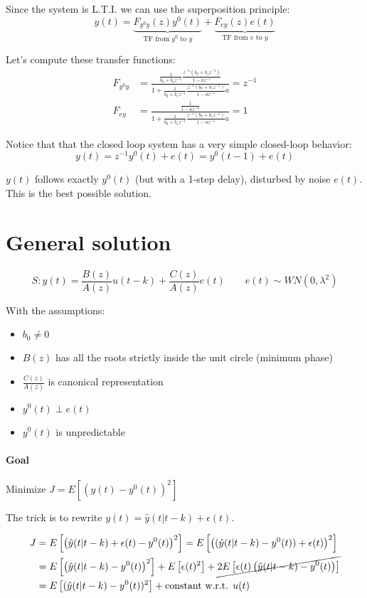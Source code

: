 Since the system is L.T.I. we can use the superposition principle:
\[
    y(t) = \underbrace{F_{y^0y}(z)y^0(t)}_\text{TF from $y^0$ to $y$} + \underbrace{F_{ey}(z)e(t)}_\text{TF from $e$ to $y$}
\]

Let's compute these transfer functions:
\begin{align*}
    F_{y^0y} &= \frac{ \frac{1}{b_0+b_1z^{-1}} \frac{z^{-1}(b_0+b_1z^{-1})}{1-az^{-1}} }{ 1 + \frac{1}{b_0+b_1z^{-1}} \frac{z^{-1}(b_0+b_1z^{-1})}{1-az^{-1}}a } = z^{-1} \\
    F_{ey} &= \frac{ \frac{1}{1-az^{-1}} }{ 1 + \frac{1}{b_0+b_1z^{-1}} \frac{z^{-1}(b_0+b_1z^{-1})}{1-az^{-1}}a } = 1
\end{align*}

Notice that that the closed loop system has a very simple closed-loop behavior:
\[
    y(t) = z^{-1}y^0(t) + e(t) = y^0(t-1) + e(t)
\]

$y(t)$ follows exactly $y^0(t)$ (but with a 1-step delay), disturbed by noise $e(t)$.
This is the best possible solution.

\section{General solution}

\[
    S: y(t) = \frac{B(z)}{A(z)}u(t-k) + \frac{C(z)}{A(z)}e(t) \qquad e(t) \sim WN(0, \lambda^2)
\]

With the assumptions:
\begin{itemize}
    \item $b_0 \ne 0$
    \item $B(z)$ has all the roots strictly inside the unit circle (minimum phase)
    \item $\frac{C(z)}{A(z)}$ is canonical representation
    \item $y^0(t) \perp e(t)$
    \item $y^0(t)$ is unpredictable
\end{itemize}

\paragraph{Goal} Minimize $J = E\left[ \left( y(t) - y^0(t) \right)^2 \right]$

The trick is to rewrite $y(t) = \hat{y}(t|t-k) + \epsilon(t)$.

\begin{align*}
    J &= E\left[ \left( \hat{y}(t|t-k) + \epsilon(t) - y^0(t) \right)^2 \right] = E\left[ \left( (\hat{y}(t|t-k) - y^0(t)) + \epsilon(t) \right)^2 \right] \\
    & = E\left[ \left(\hat{y}(t|t-k) - y^0(t)\right)^2 \right] + E\left[ \epsilon(t)^2 \right] + \cancel{2E\left[ \epsilon(t)\left( \hat{y}(t|t-k) - y^0(t) \right) \right]} \\
    &= E\left[ (\hat{y}(t|t-k) - y^0(t))^2 \right] + \text{constant w.r.t. $u(t)$}
\end{align*}

